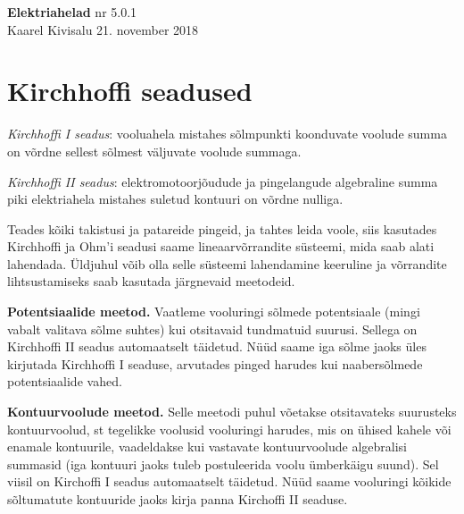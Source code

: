 \documentclass[a4paper,11pt,twocolumn]{article}
\begin{document}
{\huge \textbf{Elektriahelad} \hfill \normalsize {nr 5.0.1}} \\
{Kaarel Kivisalu \hfill 21. november 2018}

%

\section{Kirchhoffi seadused}
\textit{Kirchhoffi I seadus}: vooluahela mistahes sõlmpunkti koonduvate voolude summa on võrdne sellest sõlmest väljuvate voolude summaga.

\textit{Kirchhoffi II seadus}: elektromotoorjõudude ja pingelangude algebraline summa piki elektriahela mistahes suletud kontuuri on võrdne nulliga.

Teades kõiki takistusi ja patareide pingeid, ja tahtes leida voole, siis kasutades Kirchhoffi ja Ohm'i seadusi saame lineaarvõrrandite süsteemi, mida saab alati lahendada. Üldjuhul võib olla selle süsteemi lahendamine keeruline ja võrrandite lihtsustamiseks saab kasutada järgnevaid meetodeid.

\textbf{Potentsiaalide meetod.} Vaatleme vooluringi sõlmede potentsiaale (mingi vabalt valitava sõlme suhtes) kui otsitavaid tundmatuid suurusi. Sellega on Kirchhoffi II seadus automaatselt täidetud. Nüüd saame iga sõlme jaoks üles kirjutada Kirchhoffi I seaduse, arvutades pinged harudes kui naabersõlmede potentsiaalide vahed.

\textbf{Kontuurvoolude meetod.} Selle meetodi puhul võetakse otsitavateks suurusteks kontuurvoolud, st tegelikke voolusid vooluringi harudes, mis on ühised kahele või enamale kontuurile, vaadeldakse kui vastavate kontuurvoolude algebralisi summasid (iga kontuuri jaoks tuleb postuleerida voolu ümberkäigu suund). Sel viisil on Kirchoffi I seadus automaatselt täidetud. Nüüd saame vooluringi kõikide sõltumatute kontuuride jaoks kirja panna Kirchoffi II seaduse.
\end{document}

